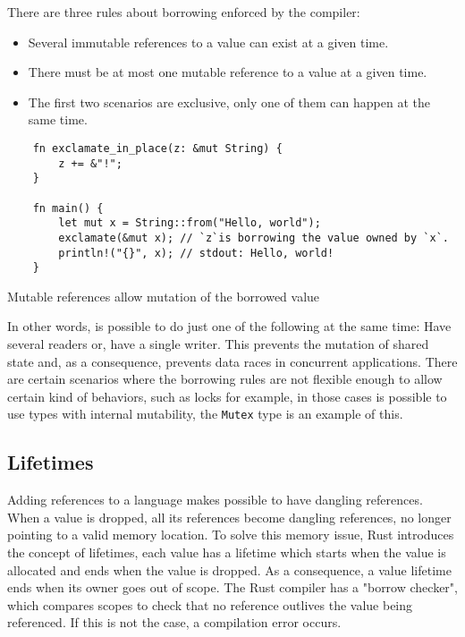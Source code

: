 There are three rules about borrowing enforced by the compiler:
\begin{itemize}
    \item Several immutable references to a value can exist at a given time.
    \item There must be at most one mutable reference to a value at a given time.
    \item The first two scenarios are exclusive, only one of them can happen at the same time.
\end{itemize}

\begin{listing}[ht]
	\begin{verbatim}
    fn exclamate_in_place(z: &mut String) {
        z += &"!";    
    }

    fn main() {
        let mut x = String::from("Hello, world");
        exclamate(&mut x); // `z`is borrowing the value owned by `x`.
        println!("{}", x); // stdout: Hello, world!
    }
	\end{verbatim}
  \caption{Mutable references allow mutation of the borrowed value}
  \label{lst:mutable_ref}
\end{listing}

In other words, is possible to do just one of the following at the same time:
Have several readers or, have a single writer. This prevents the mutation of
shared state and, as a consequence, prevents data races in concurrent
applications. There are certain scenarios where the borrowing rules are not
flexible enough to allow certain kind of behaviors, such as locks for example,
in those cases is possible to use types with internal mutability, the
\texttt{Mutex} type is an example of this.

\subsection{Lifetimes}

Adding references to a language makes possible to have dangling references. When
a value is dropped, all its references become dangling references, no longer
pointing to a valid memory location. To solve this memory issue, Rust introduces
the concept of lifetimes, each value has a lifetime which starts when the value
is allocated and ends when the value is dropped. As a consequence, a value
lifetime ends when its owner goes out of scope. The Rust compiler has a "borrow
checker", which compares scopes to check that no reference outlives the value
being referenced. If this is not the case, a compilation error occurs.

